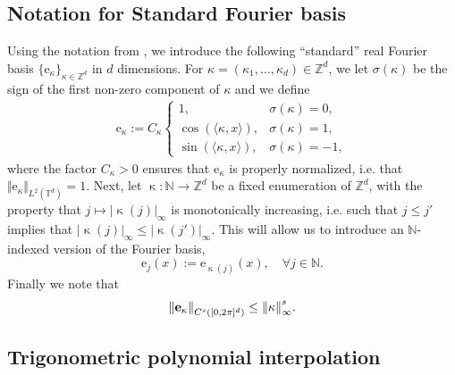 \documentclass{article}
\numberwithin{equation}{section}
\newcommand{\fb}{\bm{\mathrm{e}}}
\newcommand{\T}{\mathbb{T}}
\newcommand{\N}{\mathbb{N}}
\newcommand{\Z}{\mathbb{Z}}
\newcommand{\enum}{{\upkappa}}
\newcommand{\1}{\mathbbm{1}}
\begin{document}
\subsection{Notation for Standard Fourier basis}  
\label{app:Fourier}
Using the notation from \cite{LMK1}, we introduce the following ``standard'' real Fourier basis $\{\fb_{\kappa}\}_{\kappa\in \Z^d}$ in $d$ dimensions. For $\kappa = (\kappa_1,\dots, \kappa_d)\in \Z^d$, we let $\sigma(\kappa)$ be the sign of the first non-zero component of $\kappa$ and we define
\begin{align}
\fb_{\kappa}
:=
C_{\kappa}
\begin{cases}
1,
& \sigma(\kappa)=0, \\
\cos(\langle\kappa,{x}\rangle),
& \sigma(\kappa)=1, \\
\sin(\langle\kappa,{x}\rangle),
& \sigma(\kappa)=-1,
\end{cases}
\end{align}
where the factor $C_\kappa > 0$ ensures that $\fb_{\kappa}$ is properly normalized, i.e. that $\Vert \fb_{\kappa} \Vert_{L^2(\T^d)} = 1$. Next, let $\enum: \N \to \Z^d$ be a fixed enumeration of $\Z^d$, with the property that $j \mapsto |\enum(j)|_\infty$ is monotonically increasing, i.e. such that $j\le j'$ implies that $|\enum(j)|_\infty \le |\enum(j')|_\infty$. This will allow us to introduce an $\N$-indexed version of the Fourier basis, 
\begin{equation}
\fb_j({x}) := \fb_{\enum(j)}({x}), \quad\forall j\in \N. 
\end{equation}
Finally we note that
\begin{equation}\label{eq:bound-fourier-basis}
    \norm{\fb_{\kappa}}_{C^s([0,2\pi]^d)} \leq \norm{\kappa}_\infty^s. 
\end{equation}

\subsection{Trigonometric polynomial interpolation}\label{app:trig-pol}
\end{document}
